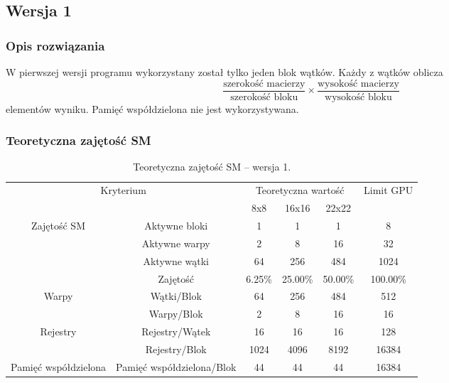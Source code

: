 
\subsection{Wersja 1}

\subsubsection{Opis rozwiązania}

W pierwszej wersji programu wykorzystany został tylko jeden blok wątków. Każdy z wątków oblicza\footnotemark $$\frac{\text{szerokość macierzy}}{\text{szerokość bloku}} \times \frac{\text{wysokość macierzy}}{\text{wysokość bloku}}$$ elementów wyniku. Pamięć współdzielona nie jest wykorzystywana.



\subsubsection{Teoretyczna zajętość SM}

\begin{center}
\begin{table}[H]
\centering
\begin{tabular}{|c|c|c|c|c|c|}
\hline
\multicolumn{2}{|c|}{\multirow{2}{*}{Kryterium}} & \multicolumn{3}{c|}{Teoretyczna wartość} & \multirow{2}{*}{Limit GPU} \\ \cline{3-5}
\multicolumn{2}{|c|}{} & 8x8 & 16x16 & 22x22 & \\ \hline
\multirow{4}{*}{Zajętość SM} & Aktywne bloki & 1 & 1 & 1 & 8 \\ \cline{2-6}
& Aktywne warpy & 2 & 8 & 16 & 32 \\ \cline{2-6}
& Aktywne wątki & 64 & 256 & 484 & 1024 \\ \cline{2-6}
& Zajętość & 6.25\% & 25.00\% & 50.00\% & 100.00\% \\ \hline
\multirow{2}{*}{Warpy} & Wątki/Blok & 64 & 256 & 484 & 512 \\ \cline{2-6}
& Warpy/Blok & 2 & 8 & 16 & 16 \\ \hline
\multirow{2}{*}{Rejestry} & Rejestry/Wątek & 16 & 16 & 16 & 128 \\ \cline{2-6}
& Rejestry/Blok & 1024 & 4096 & 8192 & 16384 \\ \hline
\multirow{1}{*}{Pamięć współdzielona} & Pamięć współdzielona/Blok & 44 & 44 & 44 & 16384 \\ \hline
\end{tabular}
\caption{Teoretyczna zajętość SM -- wersja 1.}
\end{table}
\end{center}

